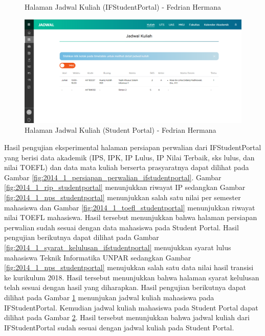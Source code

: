 \begin{itemize}
\begin{enumerate}
\begin{figure}[H]
			\caption{Halaman Jadwal Kuliah (IFStudentPortal) - Fedrian Hermana}
			\label{fig:2014_1_jadwal_kuliah_ifstudentportal}
		\end{figure}
		\begin{figure}[H]
			\centering
			\includegraphics[scale=0.45]{Gambar/HasilPengujian/2014_1_jadwal_kuliah_studentportal}
			\caption{Halaman Jadwal Kuliah (Student Portal) - Fedrian Hermana}
			\label{fig:2014_1_jadwal_kuliah_studentportal}
		\end{figure}
		Hasil pengujian eksperimental halaman persiapan perwalian dari IFStudentPortal yang berisi data akademik (IPS, IPK, IP Lulus, IP Nilai Terbaik, sks lulus, dan nilai TOEFL) dan data mata kuliah berserta prasyaratnya dapat dilihat pada Gambar \ref{fig:2014_1_persiapan_perwalian_ifstudentportal}. Gambar \ref{fig:2014_1_rip_studentportal} menunjukkan riwayat IP sedangkan Gambar \ref{fig:2014_1_nps_studentportal} menunjukkan salah satu nilai per semester mahasiswa dan Gambar \ref{fig:2014_1_toefl_studentportal} menunjukkan riwayat nilai TOEFL mahasiswa. Hasil tersebut menunjukkan bahwa halaman persiapan perwalian sudah sesuai dengan data mahasiswa pada Student Portal. Hasil pengujian berikutnya dapat dilihat pada Gambar \ref{fig:2014_1_syarat_kelulusan_ifstudentportal} menujukkan syarat lulus mahasiswa Teknik Informatika UNPAR sedangkan Gambar \ref{fig:2014_1_nps_studentportal} menujukkan salah satu data nilai hasil transisi ke kurikulum 2018. Hasil tersebut menunjukkan bahwa halaman syarat kelulusan telah sesuai dengan hasil yang diharapkan. Hasil pengujian berikutnya dapat dilihat pada Gambar \ref{fig:2014_1_jadwal_kuliah_ifstudentportal} menunjukan jadwal kuliah mahasiswa pada IFStudentPortal. Kemudian jadwal kuliah mahasiswa pada Student Portal dapat dilihat pada Gambar \ref{fig:2014_1_jadwal_kuliah_studentportal}. Hasil tersebut menunjukkan bahwa jadwal kuliah dari IFStudentPortal sudah sesuai dengan jadwal kuliah pada Student Portal.

\end{enumerate}
\end{itemize}
